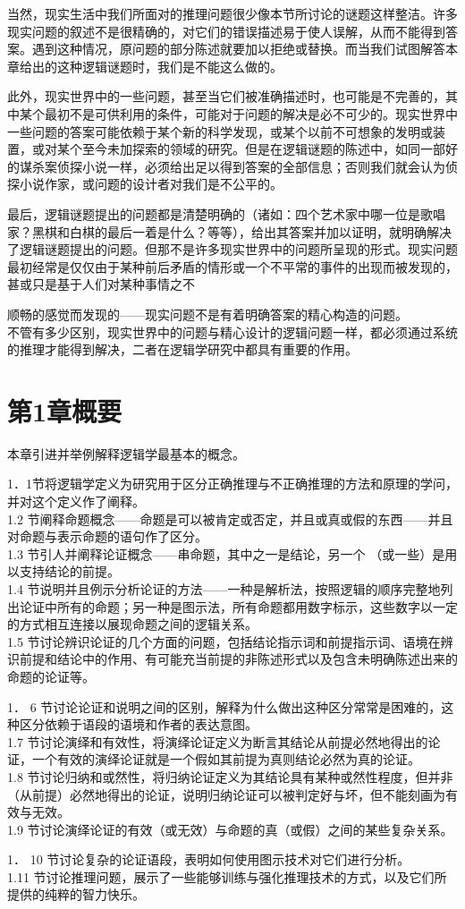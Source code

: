 当然，现实生活中我们所面对的推理问题很少像本节所讨论的谜题这样整洁。许多现实问题的叙述不是很精确的，对它们的错误描述易于使人误解，从而不能得到答案。遇到这种情况，原问题的部分陈述就要加以拒绝或替换。而当我们试图解答本章给出的这种逻辑谜题时，我们是不能这么做的。

此外，现实世界中的一些问题，甚至当它们被准确描述时，也可能是不完善的，其中某个最初不是可供利用的条件，可能对于问题的解决是必不可少的。现实世界中一些问题的答案可能依赖于某个新的科学发现，或某个以前不可想象的发明或装置，或对某个至今未加探索的领域的研究。但是在逻辑谜题的陈述中，如同一部好的谋杀案侦探小说一样，必须给出足以得到答案的全部信息；否则我们就会认为侦探小说作家，或问题的设计者对我们是不公平的。

最后，逻辑谜题提出的问题都是清楚明确的（诸如：四个艺术家中哪一位是歌唱家？黑棋和白棋的最后一着是什么？等等），给出其答案并加以证明，就明确解决了逻辑谜题提出的问题。但那不是许多现实世界中的问题所呈现的形式。现实问题最初经常是仅仅由于某种前后矛盾的情形或一个不平常的事件的出现而被发现的，甚或只是基于人们对某种事情之不

顺畅的感觉而发现的——现实问题不是有着明确答案的精心构造的问题。\\
不管有多少区别，现实世界中的问题与精心设计的逻辑问题一样，都必须通过系统的推理才能得到解决，二者在逻辑学研究中都具有重要的作用。

\section*{第1章概要}
本章引进并举例解释逻辑学最基本的概念。

1．1节将逻辑学定义为研究用于区分正确推理与不正确推理的方法和原理的学问，并对这个定义作了阐释。\\
1.2 节阐释命题概念——命题是可以被肯定或否定，并且或真或假的东西——并且对命题与表示命题的语句作了区分。\\
1.3 节引人并阐释论证概念——串命题，其中之一是结论，另一个 （或一些）是用以支持结论的前提。\\
1.4 节说明并且例示分析论证的方法——一种是解析法，按照逻辑的顺序完整地列出论证中所有的命题；另一种是图示法，所有命题都用数字标示，这些数字以一定的方式相互连接以展现命题之间的逻辑关系。\\
1.5 节讨论辨识论证的几个方面的问题，包括结论指示词和前提指示词、语境在辨识前提和结论中的作用、有可能充当前提的非陈述形式以及包含未明确陈述出来的命题的论证等。

1． 6 节讨论论证和说明之间的区别，解释为什么做出这种区分常常是困难的，这种区分依赖于语段的语境和作者的表达意图。\\
1.7 节讨论演绎和有效性，将演绎论证定义为断言其结论从前提必然地得出的论证，一个有效的演绎论证就是一个假如其前提为真则结论必然为真的论证。\\
1.8 节讨论归纳和或然性，将归纳论证定义为其结论具有某种或然性程度，但并非（从前提）必然地得出的论证，说明归纳论证可以被判定好与坏，但不能刻画为有效与无效。\\
1.9 节讨论演绎论证的有效（或无效）与命题的真（或假）之间的某些复杂关系。

1． 10 节讨论复杂的论证语段，表明如何使用图示技术对它们进行分析。\\
1.11 节讨论推理问题，展示了一些能够训练与强化推理技术的方式，以及它们所提供的纯粹的智力快乐。

